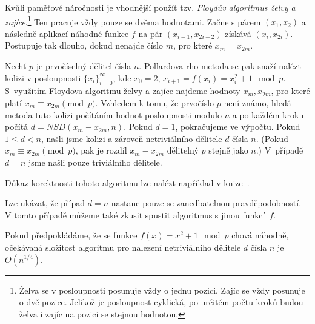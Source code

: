 \documentclass[
  program=infoi,
  biblatex=false,
  figures=true,
  glossaries,
  tables=false,
  sourcecodes=true,
  index
]{kidiplom}
\begin{document}
            \begin{remark}
                Kvůli paměťové náročnosti je vhodnější použít tzv. \emph{Floydův algoritmus želvy a zajíce}.\footnote{Želva
                se v posloupnosti posunuje vždy o jednu pozici.
                Zajíc se vždy posunuje o dvě pozice.
                Jelikož je posloupnost cyklická, po určitém počtu kroků budou želva i zajíc na pozici se stejnou hodnotou.}
                Ten pracuje vždy pouze se dvěma hodnotami.
                Začne s párem $(x_1,x_2)$ a následně aplikací náhodné funkce $f$ na pár $(x_{i-1},x_{2i-2})$ získává $(x_{i},x_{2i})$.
                Postupuje tak dlouho, dokud nenajde číslo $m$, pro které $x_m = x_{2m}$.
            \end{remark}

            Nechť $p$ je prvočíselný dělitel čísla $n$.
            Pollardova rho metoda se pak snaží nalézt kolizi v posloupnosti
            $\{x_i\}^{\infty}_{i=0}$, kde $x_0=2$, $x_{i+1}= f(x_i) = x_i^2+1\mod{p}$.
            S~využitím Floydova algoritmu želvy a zajíce najdeme hodnoty
            $x_m, x_{2m}$, pro které platí $x_m \equiv x_{2m} \pmod{p}$.
            Vzhledem k tomu, že prvočíslo $p$ není známo, hledá metoda tuto kolizi
            počítáním hodnot posloupnosti modulo $n$ a po každém kroku počítá $d = NSD(x_m-x_{2m},n)$.
            Pokud $d = 1$, pokračujeme ve výpočtu.
            Pokud $1 \leq d < n$, našli jsme kolizi a zároveň netriviálního dělitele $d$ čísla $n$.
            (Pokud $x_m \equiv x_{2m} \pmod{p}$, pak je rozdíl $x_m-x_{2m}$ dělitelný $p$ stejně jako $n$.)
            V~případě $d = n$ jsme našli pouze triviálního dělitele.
            
            Důkaz korektnosti tohoto algoritmu lze nalézt například v knize~\cite{primes-and-factorization}.

            \begin{remark}
                Lze ukázat, že případ $d = n$ nastane pouze se zanedbatelnou pravděpodobností.
                V tomto případě můžeme také zkusit spustit algoritmus s jinou funkcí~$f$.
            \end{remark}

            \medskip

            \begin{theorem}
                Pokud předpokládáme, že se funkce $f(x) = x^2 + 1 \mod{p}$ chová náhodně, očekávaná
                složitost algoritmu pro nalezení netriviálního dělitele $d$ čísla $n$ je $O(n^{1/4})$.
            \end{theorem}
\end{document}
